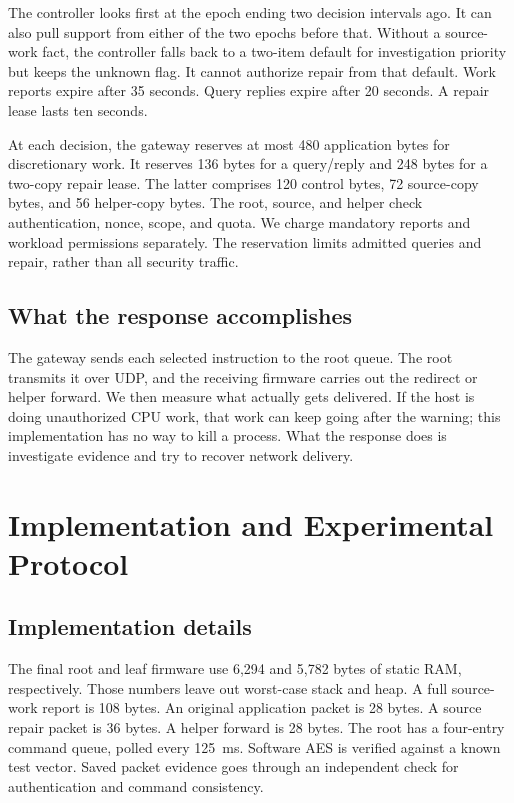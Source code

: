 \documentclass[journal]{IEEEtran}
\begin{document}
The controller looks first at the epoch ending two decision intervals ago. It can also pull support from either of the two epochs before that. Without a source-work fact, the controller falls back to a two-item default for investigation priority but keeps the unknown flag. It cannot authorize repair from that default. Work reports expire after 35 seconds. Query replies expire after 20 seconds. A repair lease lasts ten seconds.

At each decision, the gateway reserves at most 480 application bytes for discretionary work. It reserves 136 bytes for a query/reply and 248 bytes for a two-copy repair lease. The latter comprises 120 control bytes, 72 source-copy bytes, and 56 helper-copy bytes. The root, source, and helper check authentication, nonce, scope, and quota. We charge mandatory reports and workload permissions separately. The reservation limits admitted queries and repair, rather than all security traffic.

\subsection{What the response accomplishes}
The gateway sends each selected instruction to the root queue. The root transmits it over UDP, and the receiving firmware carries out the redirect or helper forward. We then measure what actually gets delivered. If the host is doing unauthorized CPU work, that work can keep going after the warning; this implementation has no way to kill a process. What the response does is investigate evidence and try to recover network delivery.

\section{Implementation and Experimental Protocol}
\subsection{Implementation details}
The final root and leaf firmware use 6,294 and 5,782 bytes of static RAM, respectively. Those numbers leave out worst-case stack and heap. A full source-work report is 108 bytes. An original application packet is 28 bytes. A source repair packet is 36 bytes. A helper forward is 28 bytes. The root has a four-entry command queue, polled every 125~ms. Software AES is verified against a known test vector. Saved packet evidence goes through an independent check for authentication and command consistency.
\end{document}
